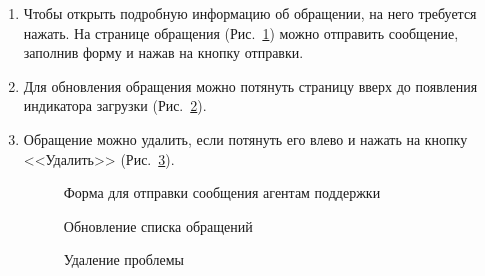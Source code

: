 \documentclass{../includes/TechDoc}
\begin{document}
\begin{enumerate}
        \item Чтобы открыть подробную информацию об обращении, на него требуется нажать.
        На странице обращения (Рис.~\ref{ris:problem_input_message}) можно отправить сообщение, заполнив форму и нажав на кнопку отправки.
        \item Для обновления обращения можно потянуть страницу вверх до появления индикатора загрузки (Рис.~\ref{ris:problem_list_refresh}).
        \item Обращение можно удалить, если потянуть его влево и нажать на кнопку <<Удалить>> (Рис.~\ref{ris:problem_delete}).
        \begin{figure}[h]
            \centering
            \caption{Форма для отправки сообщения агентам поддержки}
            \label{ris:problem_input_message}
        \end{figure}
        \begin{figure}[h]
            \centering
            \caption{Обновление списка обращений}
            \label{ris:problem_list_refresh}
        \end{figure}
        \begin{figure}[h]
            \centering
            \caption{Удаление проблемы}
            \label{ris:problem_delete}
        \end{figure}


\end{enumerate}
\end{document}
